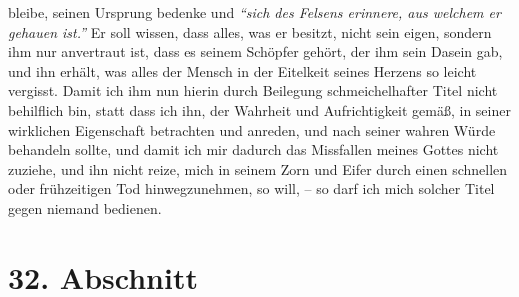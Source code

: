 bleibe,
seinen Ursprung bedenke und
\textit{"`sich des Felsens erinnere, aus welchem er gehauen
ist."'}
Er soll wissen, dass alles, was er besitzt, nicht sein
eigen, sondern ihm nur anvertraut ist, dass es seinem Schöpfer gehört, der ihm
sein Dasein gab, und ihn erhält, was alles der Mensch in der Eitelkeit
seines Herzens so leicht vergisst. Damit ich ihm nun hierin durch Beilegung
schmeichelhafter Titel nicht behilflich bin, statt dass ich ihn, der Wahrheit
und
Aufrichtigkeit gemäß, in seiner wirklichen Eigenschaft betrachten und anreden,
und nach seiner wahren Würde behandeln sollte, und damit ich mir dadurch das
Missfallen meines Gottes nicht zuziehe, und ihn nicht reize, mich in seinem Zorn
und Eifer durch einen schnellen oder frühzeitigen Tod hinwegzunehmen, so will,
-- so darf ich mich solcher Titel gegen niemand bedienen.

\section{32. Abschnitt} \label{kap9_ab32}

